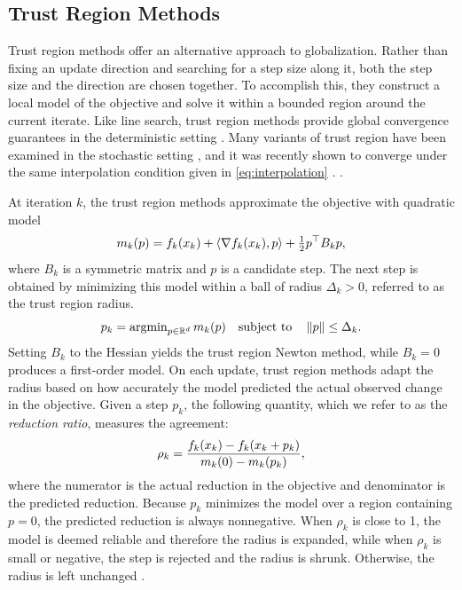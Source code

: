   \subsection{Trust Region Methods}
  Trust region methods offer an alternative approach to globalization. Rather than fixing an update direction and searching for a step size along it, both the step size and the direction are chosen together. To accomplish this, they construct a local model of the objective and solve it within a bounded region around the current iterate. Like line search, trust region methods provide global convergence guarantees in the deterministic setting \cite{nocedal2006numerical}. Many variants of trust region have been examined in the stochastic setting , and it was recently shown to converge under the same interpolation condition given in \ref{eq:interpolation} . . 
  
  At iteration $k$, the trust region methods approximate the objective with quadratic model
  \begin{equation}
      m_k(p) = f_k(x_{k}) + \langle \nabla f_k(x_{k}), p \rangle + \tfrac{1}{2} p^\top B_k p,
      \label{eq:tr_model}
  \end{equation}
  where $B_k$ is a symmetric matrix and $p$ is a candidate step. The next step is obtained by minimizing this model within a ball of radius $\Delta_k > 0$, referred to as the trust region radius.
  \begin{equation}
      p_k = \operatorname{argmin}_{p \in \mathbb{R}^d} m_k(p) \quad \text{subject to} \quad \left \lVert p \right \rVert \le \Delta_k.
      \label{eq:tr_subproblem}
  \end{equation}
  Setting $B_k$ to the Hessian yields the trust region Newton method, while $B_k = 0$ \cite{nocedal2006numerical} produces a first-order model. On each update, trust region methods adapt the radius based on how accurately the model predicted the actual observed change in the objective. Given a step $p_k$, the following quantity, which we refer to as the \textit{reduction ratio}, measures the agreement:
  \begin{equation}
      \rho_k = \frac{f_k(x_{k}) - f_k(x_{k} + p_k)}{m_k(0) - m_k(p_k)},
      \label{eq:tr_ratio}
  \end{equation}
  where the numerator is the actual reduction in the objective and denominator is the predicted reduction. Because $p_k$ minimizes the model over a region containing $p = 0$, the predicted reduction is always nonnegative. When $\rho_k$ is close to 1, the model is deemed reliable and therefore the radius is expanded, while when $\rho_k$ is small or negative, the step is rejected and the radius is shrunk. Otherwise, the radius is left unchanged \cite{nocedal2006numerical}.
  
